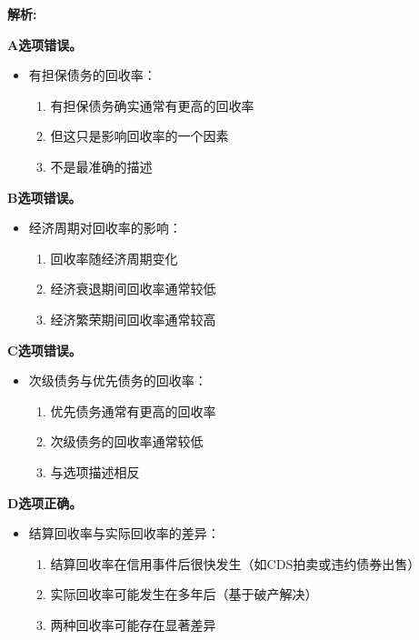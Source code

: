 \documentclass{article}
\newenvironment{explanation}
{\textbf{解析:}\par}
{\par}
\begin{document}
\begin{explanation}
    \textbf{A选项错误。}
    \begin{itemize}
        \item 有担保债务的回收率：
        \begin{enumerate}
            \item 有担保债务确实通常有更高的回收率
            \item 但这只是影响回收率的一个因素
            \item 不是最准确的描述
        \end{enumerate}
    \end{itemize}
    
    \textbf{B选项错误。}
    \begin{itemize}
        \item 经济周期对回收率的影响：
        \begin{enumerate}
            \item 回收率随经济周期变化
            \item 经济衰退期间回收率通常较低
            \item 经济繁荣期间回收率通常较高
        \end{enumerate}
    \end{itemize}
    
    \textbf{C选项错误。}
    \begin{itemize}
        \item 次级债务与优先债务的回收率：
        \begin{enumerate}
            \item 优先债务通常有更高的回收率
            \item 次级债务的回收率通常较低
            \item 与选项描述相反
        \end{enumerate}
    \end{itemize}
    
    \textbf{D选项正确。}
    \begin{itemize}
        \item 结算回收率与实际回收率的差异：
        \begin{enumerate}
            \item 结算回收率在信用事件后很快发生（如CDS拍卖或违约债券出售）
            \item 实际回收率可能发生在多年后（基于破产解决）
            \item 两种回收率可能存在显著差异
        \end{enumerate}
    \end{itemize}
\end{explanation}
\end{document}
